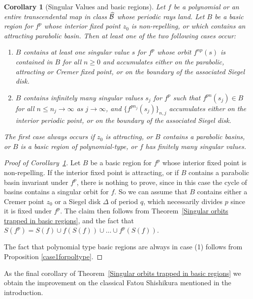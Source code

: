 \documentclass[11pt, twoside]{article}
\newtheorem{cor}[thm]{Corollary}
\theoremstyle{definition}
\newcommand{\BB}{{\cal B}}
\newcommand{\BBhat}{\widehat{\BB}}
\begin{document}
\begin{cor}[Singular Values and basic regions]\label{cor:Trapping Theorem} Let $f$ be a polynomial or an entire transcendental map in class $\BBhat$ whose periodic  rays land.    Let $B$ be a   basic region for $f^p$  whose interior fixed point $z_0$ is non-repelling, or which contains an attracting parabolic basin. Then at least one    of the two following   cases occur:
\begin{enumerate}
\item  $B$ contains  at least one singular value $s$ for $f^p$  whose orbit $f^{np}(s)$ is contained in $B$ for all $n\geq0$ and   accumulates either  on the parabolic, attracting  or Cremer fixed point, or on the boundary of the associated Siegel disk.
\item  $B$ contains  infinitely many singular values $s_j$ for $f^p$ such that $f^{pn}(s_j)\in B$ for all $n\leq n_j \to \infty$ as $j\to \infty$, and $\{f^{pn_j}(s_j)\}_{n,j}$ accumulates either  on  the interior periodic point, or on the boundary of the associated Siegel disk. 
\end{enumerate}  

 The first case always occurs if $z_0$ is attracting, or $B$ contains a parabolic basins,  or  $B$ is a basic region of polynomial-type, or $f$ has finitely many singular values. 
\end{cor} 

\begin{proof}[Proof of Corollary~\ref{cor:Trapping Theorem}]Let $B$ be a basic region for $f^p$ whose interior fixed point is non-repelling. If the interior fixed point is attracting,  or if $B$ contains a  parabolic basin invariant under $f^p$, there is nothing to prove, since in this case the cycle of  basins contains a singular orbit for $f$. So we can assume that    $B$ contains either  a Cremer  point $z_0$ or a  Siegel disk $\Delta$ of period $q$, which necessarily divides  $p$ since it is fixed under $f^p$. The claim then follows from   Theorem~\ref{Singular orbits trapped in basic regions}, and the fact that $S(f^p)=S(f)\cup f(S(f))\cup\ldots\cup f^p(S(f))$.  
 
 The fact that polynomial type basic regions are always in case (1) follows from Proposition \ref{case1forpoltype}.
\end{proof}


As the final  corollary of Theorem~\ref{Singular orbits trapped in basic regions} we obtain the improvement on the  classical Fatou Shishikura mentioned in the introduction.
\end{document}

